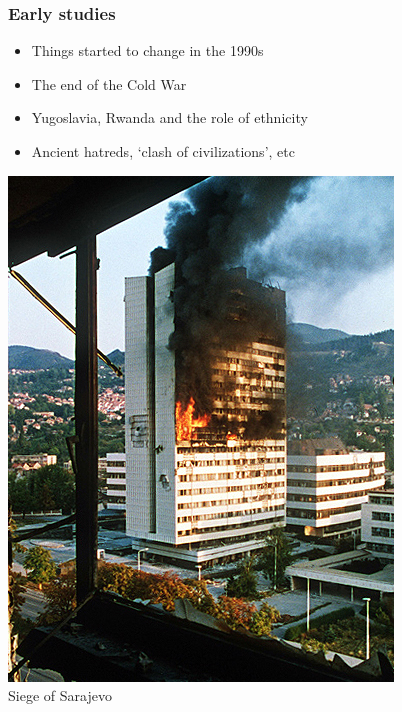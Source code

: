 \documentclass[aspectratio=43]{beamer}
\begin{document}
\begin{frame}
\frametitle{Early studies}
\centering

\begin{minipage}{0.59\textwidth}\centering
  \begin{itemize}
    \item Things started to change in the 1990s
    \item The end of the Cold War
    \item Yugoslavia, Rwanda and the role of ethnicity
    \item Ancient hatreds, `clash of civilizations', etc
  \end{itemize}
\end{minipage}\hfill
\begin{minipage}{0.39\textwidth}\centering
\includegraphics[width = \textwidth]{img/sarajevo}\\Siege of Sarajevo
\end{minipage}

\end{frame}
\end{document}
